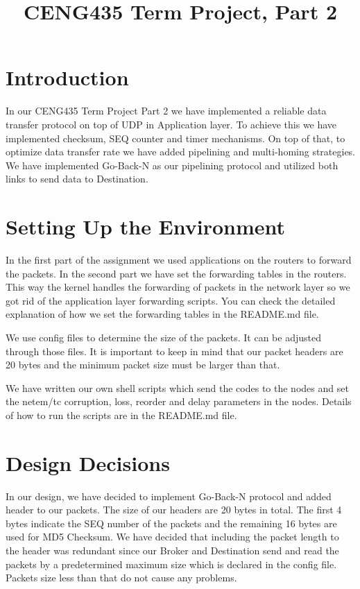 \documentclass[conference]{IEEEtran}
\begin{document}
\title{CENG435 Term Project, Part 2\\
}

\author{
\IEEEauthorblockA{
}
\and
{}
\IEEEauthorblockA{
}
}

\maketitle

\section{Introduction}

In our CENG435 Term Project Part 2 we have implemented a reliable data transfer protocol on top of UDP in Application layer. To achieve this we have implemented checksum, SEQ counter and timer mechanisms. On top of that, to optimize data transfer rate we have added pipelining and multi-homing strategies. We have implemented Go-Back-N as our pipelining protocol and utilized both links to send data to Destination.

\section{Setting Up the Environment}

In the first part of the assignment we used applications on the routers to forward the packets. In the second part we have set the forwarding tables in the routers. This way the kernel handles the forwarding of packets in the network layer so we got rid of the application layer forwarding scripts. You can check the detailed explanation of how we set the forwarding tables in the README.md file.

We use config files to determine the size of the packets. It can be adjusted through those files. It is important to keep in mind that our packet headers are 20 bytes and the minimum packet size must be larger than that.

We have written our own shell scripts which send the codes to the nodes and set the netem/tc corruption, loss, reorder and delay parameters in the nodes.
Details of how to run the scripts are in the README.md file.

\section{Design Decisions}

In our design, we have decided to implement Go-Back-N protocol and added header to our packets. The size of our headers are 20 bytes in total. The first 4 bytes indicate the SEQ number of the packets and the remaining 16 bytes are used for MD5 Checksum. We have decided that including the packet length to the header was redundant since our Broker and Destination send and read the packets by a predetermined maximum size which is declared in the config file. Packets size less than that do not cause any problems.
\end{document}
